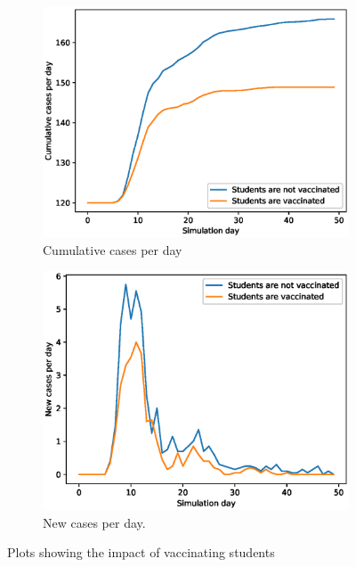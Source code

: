 \documentclass[runningheads]{llncs}
\begin{document}
\begin{figure}[h!]
	\centering
	\begin{subfigure}[b]{0.7\linewidth}
		\includegraphics[width=\textwidth]{vaccinating_cases_cum_20runs.eps}
		\caption{Cumulative cases per day} 
	\end{subfigure}
	\begin{subfigure}[b]{0.7\linewidth}
		\includegraphics[width=\textwidth]{vaccinating_cases_per_day_20runs.eps}
		\caption{New cases per day.} 
	\end{subfigure}
	\caption{Plots showing the impact of vaccinating students}
	\label{VaccinePlot}
\end{figure}
\end{document}
